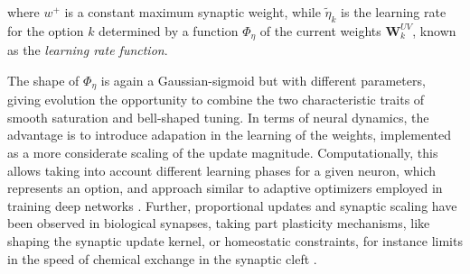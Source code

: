 \noindent where $w^{+}$ is a constant maximum synaptic weight, while $\tilde{\eta}_{k}$ is the learning rate for the option $k$ determined by a function $\Phi_{\eta}$ of the current weights $\textbf{W}^{UV}_{k}$, known as the \textit{learning rate function}.

The shape of $\Phi_{\eta}$ is again a Gaussian-sigmoid but with different parameters, giving evolution the opportunity to combine the two characteristic traits of smooth saturation and bell-shaped tuning.
In terms of neural dynamics, the advantage is to introduce adapation in the learning of the weights, implemented as a more considerate scaling of the update magnitude.
Computationally, this allows taking into account different learning phases for a given neuron, which represents an option, and approach similar to adaptive optimizers employed in training deep networks \cite{wenEvolutionRoleOptimizers2024}.
Further, proportional updates and synaptic scaling have been observed in biological synapses, taking part plasticity mechanisms, like shaping the synaptic update kernel, or homeostatic constraints, for instance limits in the speed of chemical exchange in the synaptic cleft \cite{citriSynapticPlasticityMultiple2008, larsenSynapsetypespecificPlasticityLocal2015, kennedySynapticSignalingLearning2016, samavatSynapticInformationStorage2024}.








